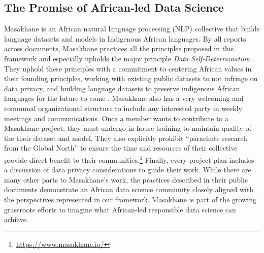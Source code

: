 \subsection{The Promise of African-led Data Science}
Masakhane is an African natural language processing (NLP) collective that builds language datasets and models in Indigenous African languages. By all reports across documents, Masakhane practices all the principles proposed in this framework and especially upholds the major principle \textit{Data Self-Determination} \cite{eke2023responsible, chan2021limits, shilongo2023creativity}.
They uphold these principles with a commitment to centering African values in their founding principles, working with existing public datasets to not infringe on data privacy, and building language datasets to preserve indigenous African languages for the future to come \cite{adelani2022masakhaner}. Masakhane also has a very welcoming and communal organizational structure to include any interested party in weekly meetings and communications. Once a member wants to contribute to a Masakhane project, they must undergo in-house training to maintain quality of the their dataset and model. They also explicitly prohibit ``parachute research from the Global North'' to ensure the time and resources of their collective provide direct benefit to their communities.\footnote{\url{https://www.masakhane.io/}} Finally, every project plan includes a discussion of data privacy considerations to guide their work. While there are many other parts to Masakhane's work, the practices described in their public documents demonstrate an African data science community closely aligned with the perspectives represented in our framework. Masakhane is part of the growing grassroots efforts to imagine what African-led responsible data science can achieve. 

